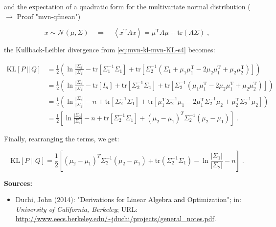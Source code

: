 \documentclass[a4paper,12pt,twoside]{book}
\begin{document}
and the expectation of a quadratic form for the multivariate normal distribution ($\rightarrow$ Proof "mvn-qfmean")

\begin{equation} \label{eq:mvn-kl-mvn-qfmean}
x \sim \mathcal{N}(\mu, \Sigma) \quad \Rightarrow \quad \left\langle x^\mathrm{T} A x \right\rangle = \mu^\mathrm{T} A \mu + \mathrm{tr}(A \Sigma) \; ,
\end{equation}

the Kullback-Leibler divergence from \eqref{eq:mvn-kl-mvn-KL-s4} becomes:

\begin{equation} \label{eq:mvn-kl-mvn-KL-s5}
\begin{split}
\mathrm{KL}[P\,||\,Q] &= \frac{1}{2} \left( \ln \frac{|\Sigma_2|}{|\Sigma_1|} - \mathrm{tr}\left[ \Sigma_1^{-1} \Sigma_1 \right] + \mathrm{tr}\left[ \Sigma_2^{-1} \left( \Sigma_1 + \mu_1 \mu_1^\mathrm{T} - 2 \mu_2 \mu_1^\mathrm{T} + \mu_2 \mu_2^\mathrm{T} \right) \right] \right) \\
&= \frac{1}{2} \left( \ln \frac{|\Sigma_2|}{|\Sigma_1|} - \mathrm{tr}\left[ I_n \right] + \mathrm{tr}\left[ \Sigma_2^{-1} \Sigma_1 \right] + \mathrm{tr}\left[ \Sigma_2^{-1} \left( \mu_1 \mu_1^\mathrm{T} - 2 \mu_2 \mu_1^\mathrm{T} + \mu_2 \mu_2^\mathrm{T} \right) \right] \right) \\
&= \frac{1}{2} \left( \ln \frac{|\Sigma_2|}{|\Sigma_1|} - n + \mathrm{tr}\left[ \Sigma_2^{-1} \Sigma_1 \right] + \mathrm{tr}\left[ \mu_1^\mathrm{T} \Sigma_2^{-1} \mu_1  - 2 \mu_1^\mathrm{T} \Sigma_2^{-1} \mu_2  + \mu_2^\mathrm{T} \Sigma_2^{-1} \mu_2 \right] \right) \\
&= \frac{1}{2} \left[ \ln \frac{|\Sigma_2|}{|\Sigma_1|} - n + \mathrm{tr}\left[ \Sigma_2^{-1} \Sigma_1 \right] + (\mu_2 - \mu_1)^T \Sigma_2^{-1} (\mu_2 - \mu_1) \right] \; .
\end{split}
\end{equation}

Finally, rearranging the terms, we get:

\begin{equation} \label{eq:mvn-kl-mvn-KL-qed}
\mathrm{KL}[P\,||\,Q] = \frac{1}{2} \left[ (\mu_2 - \mu_1)^T \Sigma_2^{-1} (\mu_2 - \mu_1) + \mathrm{tr}(\Sigma_2^{-1} \Sigma_1) - \ln \frac{|\Sigma_1|}{|\Sigma_2|} - n \right] \; .
\end{equation}


\vspace{1em}
\textbf{Sources:}
\begin{itemize}
\item Duchi, John (2014): "Derivations for Linear Algebra and Optimization"; in: \textit{University of California, Berkeley}; URL: \url{http://www.eecs.berkeley.edu/~jduchi/projects/general_notes.pdf}.
\end{itemize}
\end{document}
